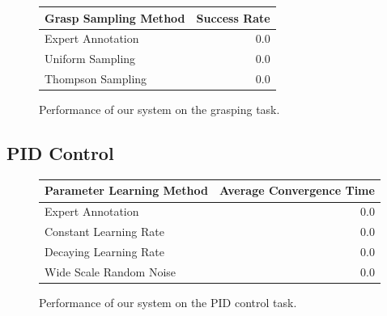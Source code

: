 \documentclass[conference]{IEEEtran}
\begin{document}
\begin{figure}
  \begin{center}
  \begin{tabular}{lr}
  \toprule
  Grasp Sampling Method & Success Rate \\ 
  \midrule
  Expert Annotation & 0.0 \\ 
  Uniform Sampling & 0.0 \\ 
  Thompson Sampling & 0.0 \\
  \bottomrule
  \end{tabular}
  \caption{Performance of our system on the grasping task.}
  \end{center}
\end{figure}

\subsection{PID Control}

\begin{figure}
  \begin{center}
  \begin{tabular}{lr}
    \toprule
  Parameter Learning Method & Average Convergence Time \\ 
  \midrule
  Expert Annotation & 0.0 \\ 
  Constant Learning Rate & 0.0 \\
  Decaying Learning Rate & 0.0 \\
  Wide Scale Random Noise & 0.0 \\
  \bottomrule
  \end{tabular}
  \caption{Performance of our system on the PID control task.}
  \end{center}
\end{figure}


\end{document}
